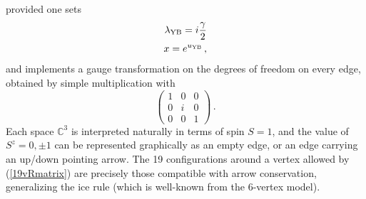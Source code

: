 \documentclass[11pt]{article}
\begin{document}
%
provided one sets
%
\begin{eqnarray}
\lambda_{\rm YB}=i{\gamma\over 2}\nonumber\\
x=e^{u_{\rm YB}} \,,
\end{eqnarray}
%
and implements a gauge transformation on the degrees of freedom on every edge, obtained by simple multiplication with
%
\begin{equation}
\left(\begin{array}{ccc} 
1&0&0\\
0&i&0\\
0&0&1\end{array}\right) \,.
\end{equation}
%
Each space $\mathbb{C}^3$ is interpreted naturally in terms of spin $S=1$, and the value of $S^z= 0,\pm 1$ can be
represented graphically as an empty edge, or an edge carrying an up/down pointing arrow. The 19 configurations
around a vertex allowed by (\ref{19vRmatrix}) are precisely those compatible with arrow conservation,
generalizing the ice rule (which is well-known from the 6-vertex model).
\end{document}
